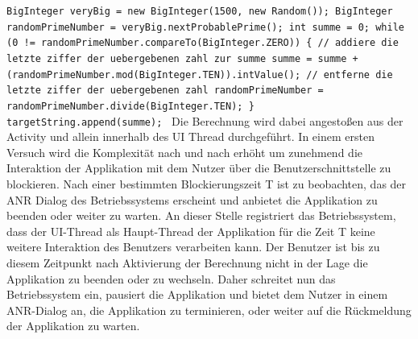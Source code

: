 \documentclass[12pt,oneside,a4paper,bibtotoc,liststotoc]{scrreprt}
\begin{document}
\texttt{BigInteger veryBig = new BigInteger(1500, new Random());\newline
BigInteger randomPrimeNumber = veryBig.nextProbablePrime();\newline
int summe = 0;\newline\newline
while (0 != randomPrimeNumber.compareTo(BigInteger.ZERO))\newline 
\{ \newline
       // addiere die letzte ziffer der uebergebenen zahl zur summe \newline
       summe = summe + (randomPrimeNumber.mod(BigInteger.TEN)).intValue(); \newline\newline\newline
       // entferne die letzte ziffer der uebergebenen zahl \newline
       randomPrimeNumber = randomPrimeNumber.divide(BigInteger.TEN); \newline
       \} \newline
targetString.append(summe);\newline
}
Die Berechnung wird dabei angestoßen aus der Activity und allein innerhalb des UI Thread durchgeführt. In einem ersten Versuch wird die Komplexität nach und nach erhöht um zunehmend die Interaktion der Applikation mit dem Nutzer über die Benutzerschnittstelle zu blockieren. Nach einer bestimmten Blockierungszeit T ist zu beobachten, das der ANR Dialog des Betriebssystems erscheint und anbietet die Applikation zu beenden oder weiter zu warten. An dieser Stelle registriert das Betriebssystem, dass der UI-Thread als Haupt-Thread der Applikation für die Zeit T keine weitere Interaktion des Benutzers verarbeiten kann. Der Benutzer ist bis zu diesem Zeitpunkt nach Aktivierung der Berechnung nicht in der Lage die Applikation zu beenden oder zu wechseln. Daher schreitet nun das Betriebssystem ein, pausiert die Applikation und bietet dem Nutzer in einem ANR-Dialog an, die Applikation zu terminieren, oder weiter auf die Rückmeldung der Applikation zu warten.
\end{document}
